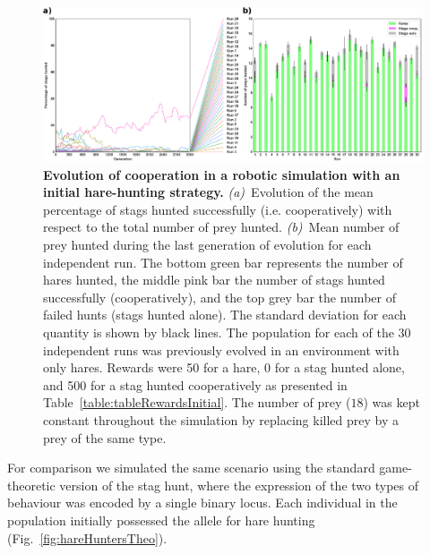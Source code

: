       \begin{figure}[hbtp]
        \centering
          \includegraphics[scale = 1]{fig/ArticleBio1/Fig3.eps}
        \caption{\textbf{Evolution of cooperation in a robotic simulation with an initial hare-hunting strategy.} 
        {\em (a)}~Evolution of the mean percentage of stags hunted successfully (i.e. cooperatively) with respect to the total number of prey hunted. {\em (b)}~Mean number of prey hunted during the last generation of evolution for each independent run. The bottom green bar represents the number of hares hunted, the middle pink bar the number of stags hunted successfully (cooperatively), and the top grey bar the number of failed hunts (stags hunted alone). The standard deviation for each quantity is shown by black lines. The population for each of the 30 independent runs was previously evolved in an environment with only hares. Rewards were 50 for a hare, 0 for a stag hunted alone, and 500 for a stag hunted cooperatively as presented in Table~\ref{table:tableRewardsInitial}. The number of prey ($18$) was kept constant throughout the simulation by replacing killed prey by a prey of the same type.}
        \label{fig:hareHuntersRob}
      \end{figure}

      For comparison we simulated the same scenario using the standard game-theoretic version of the stag hunt, where the expression of the two types of behaviour was encoded by a single binary locus. Each individual in the population initially possessed the allele for hare hunting (Fig.~\ref{fig:hareHuntersTheo}).

